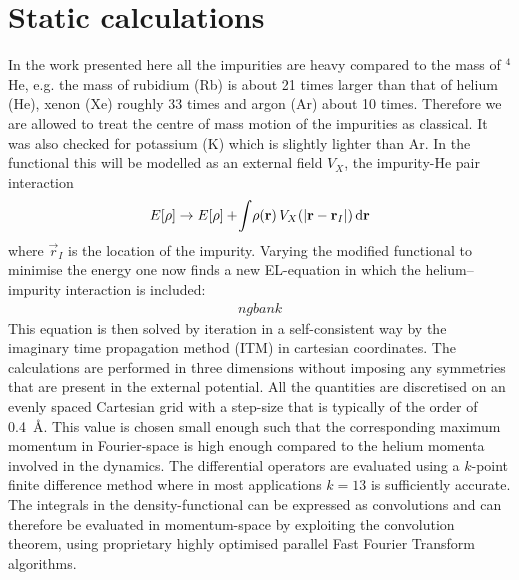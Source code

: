 	\section{Static calculations}
		In the work presented here all the impurities are heavy compared to the mass of $^4$He, e.g. the mass of rubidium (Rb) is about 21 times larger than that of helium (He), xenon (Xe) roughly 33 times and argon (Ar) about 10 times. Therefore we are allowed to treat the centre of mass motion of the impurities as classical. It was also checked for potassium (K) which is slightly lighter than Ar\citep{Martinez2017}. In the functional this will be modelled as an external field $V_X$, the impurity-He pair interaction
		\begin{align}
			E[\rho] \rightarrow E[\rho] + \!\int\!\rho(\bm{\mathrm{r}})\,V_X\qty(\abs{\bm{\mathrm{r}}-\bm{\mathrm{r}}_I})\,\mathrm{d}{\bm{\mathrm{r}}} \label{eq:el-static-hi}
		\end{align}
		where ${\vec r}_I$ is the location of the impurity. Varying the modified functional to minimise the energy one now finds a new EL-equation in which the helium--impurity interaction is included:
		\begin{align}
				ng bank 
		\end{align}
		This equation is then solved by iteration in a self-consistent way by the imaginary time propagation method\citep{Lehtovaara2007} (ITM) in cartesian coordinates. The calculations are performed in three dimensions without imposing any symmetries that are present in the external potential. All the quantities are discretised on an evenly spaced Cartesian grid with a step-size that is typically of the order of 0.4~\AA. This value is chosen small enough such that the corresponding maximum momentum in Fourier-space is high enough compared to the helium momenta involved in the dynamics. The differential operators are evaluated using a $k$-point finite difference method where in most applications $k=13$ is sufficiently accurate. The integrals in the density-functional can be expressed as convolutions and can therefore be evaluated in momentum-space by exploiting the convolution theorem, using proprietary highly optimised parallel Fast Fourier Transform algorithms. 
			
